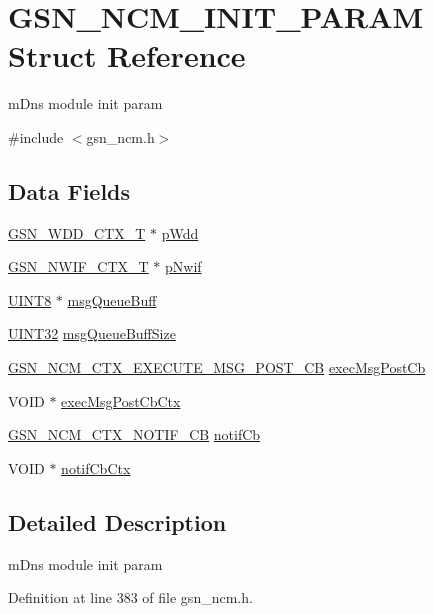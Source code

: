 \hypertarget{a00159}{
\section{GSN\_\-NCM\_\-INIT\_\-PARAM Struct Reference}
\label{a00159}
}


mDns module init param  




{\ttfamily \#include $<$gsn\_\-ncm.h$>$}

\subsection*{Data Fields}
\begin{DoxyCompactItemize}
\item 
\hyperlink{a00108}{GSN\_\-WDD\_\-CTX\_\-T} $\ast$ \hyperlink{a00159_a97684b58b7a05f9b282a86a26929e1ba}{pWdd}
\item 
\hyperlink{a00167}{GSN\_\-NWIF\_\-CTX\_\-T} $\ast$ \hyperlink{a00159_a98d510676ecd134a5e9ac61bf222cded}{pNwif}
\item 
\hyperlink{a00660_gab27e9918b538ce9d8ca692479b375b6a}{UINT8} $\ast$ \hyperlink{a00159_a7e51f5f5131592004e739bcc100a27fc}{msgQueueBuff}
\item 
\hyperlink{a00660_gae1e6edbbc26d6fbc71a90190d0266018}{UINT32} \hyperlink{a00159_a21640f5a1df0caa651f4ffe4280d6210}{msgQueueBuffSize}
\item 
\hyperlink{a00668_gaf3a0737ada4d7a112e4fff6779bc8162}{GSN\_\-NCM\_\-CTX\_\-EXECUTE\_\-MSG\_\-POST\_\-CB} \hyperlink{a00159_a5603e3f15c0a3cf1d8b11f8d09853a34}{execMsgPostCb}
\item 
VOID $\ast$ \hyperlink{a00159_aa13ea63dd76c4df311eda6a811d384f5}{execMsgPostCbCtx}
\item 
\hyperlink{a00668_ga9fb71d435556873549a9da8758741a14}{GSN\_\-NCM\_\-CTX\_\-NOTIF\_\-CB} \hyperlink{a00159_a8b4a72e6fff7893cb12d41268dcdbdf7}{notifCb}
\item 
VOID $\ast$ \hyperlink{a00159_a3b4dee05b0f332ef6668c044d86f1b28}{notifCbCtx}
\end{DoxyCompactItemize}


\subsection{Detailed Description}
mDns module init param 

Definition at line 383 of file gsn\_\-ncm.h.



